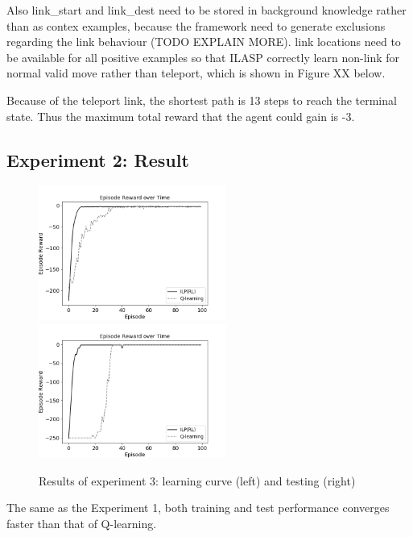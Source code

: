 Also link\_start and link\_dest need to be stored in background knowledge rather than as contex examples,
because the framework need to generate exclusions regarding the link behaviour (TODO EXPLAIN MORE).
link locations need to be available for all positive examples so that ILASP correctly learn non-link for normal valid move rather than teleport, which is shown in Figure XX below.

Because of the teleport link, the shortest path is 13 steps to reach the terminal state. Thus the maximum total reward that the agent could gain is -3.

\subsection{Experiment 2: Result}
\label{subsec:experiment2_result}
    
\begin{figure}[!htb]
\centerline{
\includegraphics[width=0.55\textwidth]{./figures/experiment2_training}
\includegraphics[width=0.55\textwidth]{./figures/experiment2_test}
}
\caption{Results of experiment 3: learning curve (left) and testing (right)}
\label{experiment2_training}
\end{figure}

The same as the Experiment 1, both training and test performance converges faster than that of Q-learning.



